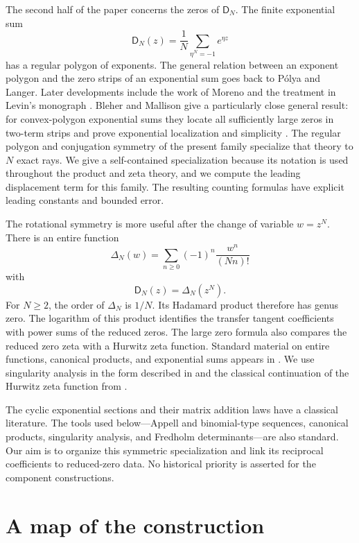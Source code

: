 \documentclass[11pt]{article}
\theoremstyle{definition}
\theoremstyle{remark}
\newcommand{\Dfun}{\mathsf D}
\begin{document}
The second half of the paper concerns the zeros of $\Dfun_N$.  The finite exponential sum
\[
\Dfun_N(z)=\frac1N\sum_{\eta^N=-1}e^{\eta z}
\]
has a regular polygon of exponents.  The general relation between an exponent polygon and the zero strips of an exponential sum goes back to P\'olya and Langer.  Later developments include the work of Moreno and the treatment in Levin's monograph \cite{Polya1920,Langer1931,Moreno1973,Levin1980}. Bleher and Mallison give a particularly close general result: for convex-polygon exponential sums they locate all sufficiently large zeros in two-term strips and prove exponential localization and simplicity \cite{BleherMallison2006}. The regular polygon and conjugation symmetry of the present family specialize that theory to $N$ exact rays. We give a self-contained specialization because its notation is used throughout the product and zeta theory, and we compute the leading displacement term for this family. The resulting counting formulas have explicit leading constants and bounded error.

The rotational symmetry is more useful after the change of variable $w=z^N$.  There is an entire function
\[
\Delta_N(w)=\sum_{n\geq 0}(-1)^n\frac{w^n}{(Nn)!}
\]
with
\[
\Dfun_N(z)=\Delta_N(z^N).
\]
For $N\geq2$, the order of $\Delta_N$ is $1/N$.  Its Hadamard product therefore has genus zero.  The logarithm of this product identifies the transfer tangent coefficients with power sums of the reduced zeros.  The large zero formula also compares the reduced zero zeta with a Hurwitz zeta function.  Standard material on entire functions, canonical products, and exponential sums appears in \cite{Boas1954,Levin1980,Titchmarsh1939}.  We use singularity analysis in the form described in \cite{FlajoletSedgewick2009} and the classical continuation of the Hurwitz zeta function from \cite{Apostol1976}.

The cyclic exponential sections and their matrix addition laws have a
classical literature. The tools used below---Appell and binomial-type
sequences, canonical products, singularity analysis, and Fredholm
determinants---are also standard. Our aim is to organize this symmetric
specialization and link its reciprocal coefficients to reduced-zero data. No
historical priority is asserted for the component constructions.



\section{A map of the construction}\label{sec:map}
\end{document}
